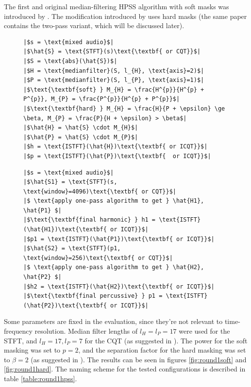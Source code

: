 \documentclass[letter,12pt]{article}
\newlength{\mintednumbersep}
\begin{document}
The first and original median-filtering HPSS algorithm with soft masks was introduced by \citet{fitzgerald1}. The modification introduced by \citet{driedger} uses hard masks (the same paper contains the two-pass variant, which will be discussed later).

\begin{figure}[h]
  \centering
 \begin{minipage}{0.48\textwidth}
  \centering
\begin{verbatim}
|$s = \text{mixed audio}$|
|$\hat{S} = \text{STFT}(s)\text{\textbf{ or CQT}}$|
|$S = \text{abs}(\hat{S})$|
|$H = \text{medianfilter}(S, l_{H}, \text{axis}=2)$|
|$P = \text{medianfilter}(S, l_{P}, \text{axis}=1)$|
|$\text{\textbf{soft} } M_{H} = \frac{H^{p}}{H^{p} + P^{p}}, M_{P} = \frac{P^{p}}{H^{p} + P^{p}}$|
|$\text{\textbf{hard} } M_{H} = \frac{H}{P + \epsilon} \ge \beta, M_{P} = \frac{P}{H + \epsilon} > \beta$|
|$\hat{H} = \hat{S} \cdot M_{H}$|
|$\hat{P} = \hat{S} \cdot M_{P}$|
|$h = \text{ISTFT}(\hat{H})\text{\textbf{ or ICQT}}$|
|$p = \text{ISTFT}(\hat{P})\text{\textbf{  or ICQT}}$|
\end{verbatim}
 \end{minipage}
\hspace{0.02\textwidth}
 \begin{minipage}{0.48\textwidth}
  \centering
\begin{verbatim}
|$s = \text{mixed audio}$|
|$\hat{S1} = \text{STFT}(s, \text{window}=4096)\text{\textbf{ or CQT}}$|
|$ \text{apply one-pass algorithm to get } \hat{H1}, \hat{P1} $|
|$\text{\textbf{final harmonic} } h1 = \text{ISTFT}(\hat{H1})\text{\textbf{ or ICQT}}$|
|$p1 = \text{ISTFT}(\hat{P1})\text{\textbf{ or ICQT}}$|
|$\hat{S2} = \text{STFT}(p1, \text{window}=256)\text{\textbf{ or CQT}}$|
|$ \text{apply one-pass algorithm to get } \hat{H2}, \hat{P2} $|
|$h2 = \text{ISTFT}(\hat{H2})\text{\textbf{ or ICQT}}$|
|$\text{\textbf{final percussive} } p1 = \text{ISTFT}(\hat{P2})\text{\textbf{ or ICQT}}$|
\end{verbatim}
 \end{minipage}
  \label{lst:pseudocodes}
\end{figure}

Some parameters are fixed in the evaluation, since they're not relevant to time-frequency resolution. Median filter lengths of $l_{H} = l_{P} = 17$ were used for the STFT, and $l_{H} = 17, l_{P} = 7$ for the CQT (as suggested in \cite{fitzgerald1, fitzgerald2}). The power for the soft masking was set to $p = 2$, and the separation factor for the hard masking was set to $\beta = 2$ (as suggested in \cite{fitzgerald1, driedger}). The results can be seen in figures \ref{fig:round1soft} and \ref{fig:round1hard}. The naming scheme for the tested configurations is described in table \ref{table:round1hpss}.
\end{document}
